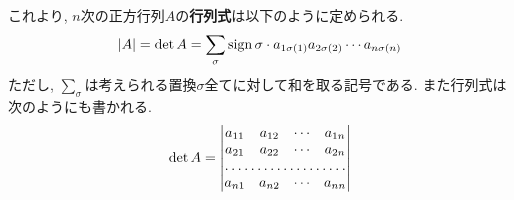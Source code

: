         これより, $n$次の正方行列$A$の\textbf{行列式}は以下のように定められる.
        \begin{equation}
            |A|=\det A = \sum_{\sigma}\mathop{\mathrm{sign}}\nolimits\sigma \cdot a_{1\sigma(1)}a_{2\sigma(2)}\cdots a_{n\sigma(n)} \label{eq:線形代数:行列式の定義}
        \end{equation}
        ただし, $\sum\limits_{\sigma}$は考えられる置換$\sigma$全てに対して和を取る記号である. また行列式は次のようにも書かれる.
        \begin{equation}
            \det A = \begin{vmatrix}
                a_{11} & a_{12} & \cdots & a_{1n} \\
                a_{21} & a_{22} & \cdots & a_{2n} \\
                \hdotsfor{4}\\
                a_{n1} & a_{n2} & \cdots & a_{nn}
            \end{vmatrix} \label{eq:線形代数:行列式の表記}
        \end{equation}

